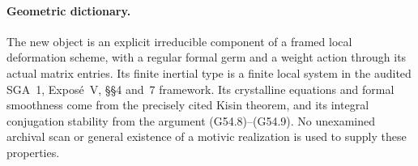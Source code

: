 \paragraph{Geometric dictionary.}
The new object is an explicit irreducible component
of a framed local deformation scheme, with a regular
formal germ and a weight action through its actual
matrix entries.  Its finite inertial type is a
finite local system in the audited SGA~1, Expos\'e~V,
\S\S4 and~7 framework.  Its crystalline equations
and formal smoothness come from the precisely cited
Kisin theorem, and its integral conjugation stability
from the argument (G54.8)--(G54.9).  No unexamined
archival scan or general existence of a motivic
realization is used to supply these properties.
